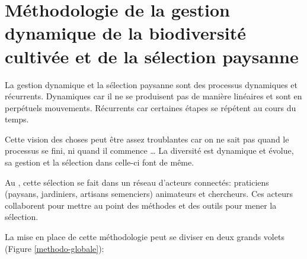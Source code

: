 \section{Méthodologie de la gestion dynamique de la biodiversité cultivée et de la sélection paysanne}

La gestion dynamique et la sélection paysanne sont des processus dynamiques et récurrents.
Dynamiques car il ne se produisent pas de manière linéaires et sont en perpétuels mouvements.
Récurrents car certaines étapes se répétent au cours du temps.

Cette vision des choses peut être assez troublantes car on ne sait pas quand le processus se fini, ni quand il commence \dots
La diversité est dynamique et évolue, sa gestion et la sélection dans celle-ci font de même.

Au \RSP, cette sélection se fait dans un réseau d’acteurs connectés: praticiens (paysans, jardiniers, artisans semenciers) animateurs et chercheurs.
Ces acteurs collaborent pour mettre au point des méthodes et des outils pour mener la sélection.

La mise en place de cette méthodologie peut se diviser en deux grands volets (Figure \ref{methodo-globale}):

